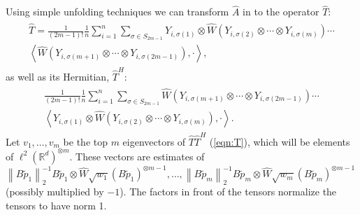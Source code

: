 \documentclass[aos,preprint]{imsart}
\def\rn{\mathbb{R}}
\def\l{\left}
\def\r{\right}
\def\lrd{{\ell^2\left( \rn^d \right)}}
\theoremstyle{plain}
\theoremstyle{defintion}
\begin{document}
Using simple unfolding techniques we can transform $\widehat{A}$ in to the operator $\widehat{T}$: 
\begin{eqnarray*}\begin{split}
	\widehat{T} = \frac{1}{\left( 2m-1 \right)!} \frac{1}{n} \sum_{i=1}^n \sum_{\sigma \in S_{2m-1}} Y_{i,\sigma\left( 1 \right)} \otimes \widehat{W} \left( Y_{i,\sigma\left( 2 \right)} \otimes \cdots \otimes Y_{i,\sigma\left( m \right)} \right) \cdots\\
	\l< \widehat{W}\left( Y_{i,\sigma\left( m+1 \right)} \otimes \cdots \otimes Y_{i,\sigma\left( 2m-1 \right)} \right), \cdot \r>,
\end{split}
	\end{eqnarray*}
	as well as its Hermitian, $\widehat{T}^H$:
	\begin{eqnarray*}
	\begin{split}\frac{1}{\left( 2m-1 \right)!} \frac{1}{n} \sum_{i=1}^n \sum_{\sigma \in S_{2m-1}} \widehat{W}\left( Y_{i,\sigma\left( m+1 \right)} \otimes \cdots \otimes Y_{i,\sigma\left( 2m-1 \right)} \right)\cdots \\ \l< Y_{i,\sigma\left( 1 \right)} \otimes \widehat{W} \left( Y_{i,\sigma\left( 2 \right)} \otimes \cdots \otimes Y_{i,\sigma\left( m \right)} \right), \cdot \r>.\end{split}
	\end{eqnarray*}
	Let $v_1,\ldots, v_m$ be the top $m$ eigenvectors of $\widehat{T}\widehat{T}^H$  (\ref{eqn:T}), which will be elements of $\lrd^{\otimes m}$.
	\sloppy These vectors are estimates of $ \l\|B\tilde{p}_1\r\|_2^{-1}B \tilde{p}_1 \otimes \widehat{W} \sqrt{w_1} \left( B\tilde{p}_1 \right)^{\otimes m-1},\ldots,\l\|B\tilde{p}_m\r\|_2^{-1}B \tilde{p}_m \otimes \widehat{W} \sqrt{w_m} \left( B\tilde{p}_m \right)^{\otimes m-1}$ (possibly multiplied by $-1$). The factors in front of the tensors normalize the tensors to have norm 1.
\end{document}
